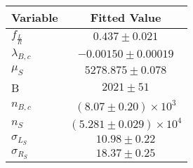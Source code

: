 \begin{tabular}[t]{lc}
\hline
Variable &Fitted Value\\
\hline\hline
$f_{\frac{L}{R}}$&$0.437\pm0.021$\\
\hline
$\lambda_{B,c}$&$-0.00150\pm0.00019$\\
\hline
$\mu_S$&$5278.875\pm0.078$\\
\hline
B&$2021\pm51$\\
\hline
$n_{B,c}$&$(8.07\pm0.20)\times 10^3$\\
\hline
$n_S$&$(5.281\pm0.029)\times 10^4$\\
\hline
$\sigma_{L_S}$&$10.98\pm0.22$\\
\hline
$\sigma_{R_S}$&$18.37\pm0.25$\\
\hline
\end{tabular}